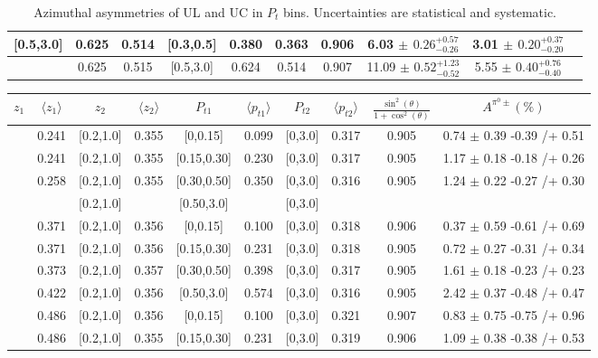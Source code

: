 \begin{table}[H]
\begin{tabular}{|c| c| c| c| c| c| c| c| c| c|}
[0.5,3.0]	&	0.625	&	0.514	&	[0.3,0.5]	&	0.380	&	0.363	&	0.906	&	6.03	$\pm$ $	0.26	_{	-0.26	}^{+	0.57	}$&	3.01	$\pm$ $	0.20	_{	-0.20	}^{+	0.37	}$\\ \hline
[0.5,3.0]	&	0.625	&	0.515	&	[0.5,3.0]	&	0.624	&	0.514	&	0.907	&	11.09	$\pm$ $	0.52	_{	-0.52	}^{+	1.23	}$&	5.55	$\pm$ $	0.40	_{	-0.40	}^{+	0.76	}$\\ \hline
\end{tabular}
\caption{Azimuthal asymmetries of UL and UC in $P_t$ bins. Uncertainties are statistical and systematic.}
\label{tab:finalulucptbins}
\end{table}

\begin{table}[H]\scriptsize
\centering
\begin{tabular}{|c| c| c| c| c| c| c| c| c| c|}
\hline
$z_1$& $\langle  z_{1}  \rangle$ & $z_2$ & $\langle  z_{2}\rangle$& $P_{t1}$ & $\langle  p_{t1} \rangle$& $P_{t2}$ &  $\langle p_{t2}\rangle$ &$\frac{\sin^2(\theta)}{1+\cos^2(\theta)}$& $A^{\pi^0\pm}(\%)$   \\ \hline
[0.2,0.3]	&	0.241	&	[0.2,1.0]	&	0.355	&	[0,0.15]	&	0.099	&	[0,3.0]	&	0.317	&	0.905	&	0.74	$\pm$ 	0.39	-0.39	/+	0.51	\\ \hline
[0.2,0.3]	&	0.241	&	[0.2,1.0]	&	0.355	&	[0.15,0.30]	&	0.230	&	[0,3.0]	&	0.317	&	0.905	&	1.17	$\pm$ 	0.18	-0.18	/+	0.26	\\ \hline
[0.2,0.3]	&	0.258	&	[0.2,1.0]	&	0.355	&	[0.30,0.50]	&	0.350	&	[0,3.0]	&	0.316	&	0.905	&	1.24	$\pm$ 	0.22	-0.27	/+	0.30	\\ \hline
[0.2,0.3]	&		&	[0.2,1.0]	&		&	[0.50,3.0]	&		&	[0,3.0]	&		&		&							\\ \hline
 \hline
[0.3,0.5]	&	0.371	&	[0.2,1.0]	&	0.356	&	[0,0.15]	&	0.100	&	[0,3.0]	&	0.318	&	0.906	&	0.37	$\pm$ 	0.59	-0.61	/+	0.69	\\ \hline
[0.3,0.5]	&	0.371	&	[0.2,1.0]	&	0.356	&	[0.15,0.30]	&	0.231	&	[0,3.0]	&	0.318	&	0.905	&	0.72	$\pm$ 	0.27	-0.31	/+	0.34	\\ \hline
[0.3,0.5]	&	0.373	&	[0.2,1.0]	&	0.357	&	[0.30,0.50]	&	0.398	&	[0,3.0]	&	0.317	&	0.905	&	1.61	$\pm$ 	0.18	-0.23	/+	0.23	\\ \hline
[0.3,0.5]	&	0.422	&	[0.2,1.0]	&	0.356	&	[0.50,3.0]	&	0.574	&	[0,3.0]	&	0.316	&	0.905	&	2.42	$\pm$ 	0.37	-0.48	/+	0.47	\\ \hline
 \hline
[0.5,0.7]	&	0.486	&	[0.2,1.0]	&	0.356	&	[0,0.15]	&	0.100	&	[0,3.0]	&	0.321	&	0.907	&	0.83	$\pm$ 	0.75	-0.75	/+	0.96	\\ \hline
[0.5,0.7]	&	0.486	&	[0.2,1.0]	&	0.355	&	[0.15,0.30]	&	0.231	&	[0,3.0]	&	0.319	&	0.906	&	1.09	$\pm$ 	0.38	-0.38	/+	0.53	\\ \hline

\end{tabular}
\end{table}
